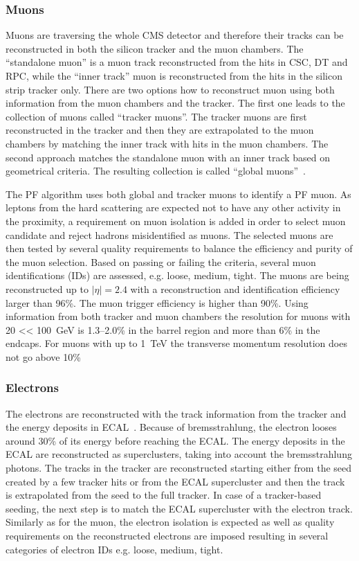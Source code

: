 \subsubsection{Muons}

Muons are traversing the whole CMS detector and therefore their tracks can be reconstructed in both the silicon tracker and the muon chambers. The ``standalone muon'' is a muon track reconstructed from the hits in CSC, DT and RPC, while the ``inner track'' muon is reconstructed from the hits in the silicon strip tracker only. There are two options how to reconstruct muon using both information from the muon chambers and the tracker. The first one leads to the collection of muons called ``tracker muons''.  The tracker muons are first reconstructed in the tracker and then they are extrapolated to the muon chambers by matching the inner track with hits in the muon chambers. The second approach matches the standalone muon with an inner track based on geometrical criteria. The resulting collection is called ``global muons''~\cite{Chatrchyan:2012xi}. 

The PF algorithm uses both global and tracker muons to identify a PF muon. As leptons from the hard scattering are expected not to have any other activity in the proximity, a requirement on muon isolation is added in order to select muon candidate and reject hadrons misidentified as muons. The selected muons are then tested by several quality requirements to balance the efficiency and purity of the muon selection. Based on passing or failing the criteria, several muon identifications (IDs) are assessed, e.g. loose, medium, tight. The muons are being reconstructed up to $|\eta|=2.4$ with a reconstruction and identification efficiency larger than 96\%. The muon trigger efficiency is higher than 90\%. Using information from both tracker and muon chambers the \pt resolution for muons with 20 <\pt < 100~GeV is 1.3--2.0\% in the barrel region and more than 6\% in the endcaps. For muons with \pt up to 1~TeV the transverse momentum resolution does not go above 10\%~\cite{Chatrchyan:2012xi}

\subsubsection{Electrons}

The electrons are reconstructed with the track information from the tracker and the energy deposits in ECAL~\cite{Khachatryan:2015hwa}. Because of bremsstrahlung, the electron looses around 30\% of its energy before reaching the ECAL. The energy deposits in the ECAL are reconstructed as superclusters, taking into account the bremsstrahlung photons. The tracks in the tracker are reconstructed starting either from the seed created by a few tracker hits or from the ECAL supercluster and then the track is extrapolated from the seed to the full tracker. In case of a tracker-based seeding, the next step is to match the ECAL supercluster with the electron track. Similarly as for the muon, the electron isolation is expected as well as quality requirements on the reconstructed electrons are imposed resulting in several categories of electron IDs e.g. loose, medium, tight.

